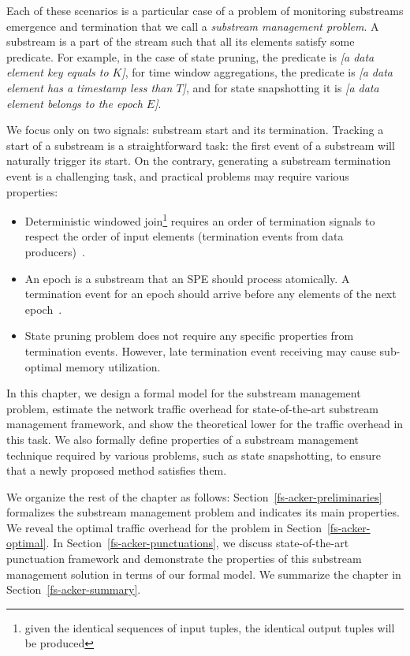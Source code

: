 Each of these scenarios is a particular case of a problem of monitoring substreams emergence and termination that we call a {\em substream management problem}. A substream is a part of the stream such that all its elements satisfy some predicate. 
For example, in the case of state pruning, the predicate is {\em [a data element key equals to $K$]}, for time window aggregations, the predicate is {\em [a data element has a timestamp less than $T$]}, and for state snapshotting it is {\em [a data element belongs to the epoch $E$]}.

We focus only on two signals: substream start and its termination. Tracking a start of a substream is a straightforward task: the first event of a substream will naturally trigger its start. On the contrary, generating a substream termination event is a challenging task, and practical problems may require various properties:
\begin{itemize}
    \item Deterministic windowed join\footnote{given the identical sequences of input tuples, the identical output tuples will be produced} requires an order of termination signals to respect the order of input elements (termination events from data producers)~\cite{najdataei2019stretch, gulisano2016scalejoin}.
    \item An epoch is a substream that an SPE should process atomically. A termination event for an epoch should arrive before any elements of the next epoch~\cite{2015arXiv150608603C}.
    \item State pruning problem does not require any specific properties from termination events. However, late termination event receiving may cause sub-optimal memory utilization.
\end{itemize}

In this chapter, we design a formal model for the substream management problem, estimate the network traffic overhead for state-of-the-art substream management framework, and show the theoretical lower for the traffic overhead in this task. We also formally define properties of a substream management technique required by various problems, such as state snapshotting, to ensure that a newly proposed method satisfies them. 

We organize the rest of the chapter as follows: 
Section~\ref{fs-acker-preliminaries} formalizes the substream management problem and indicates its main properties. We reveal the optimal traffic overhead for the problem in Section~\ref{fs-acker-optimal}. In Section~\ref{fs-acker-punctuations}, we discuss state-of-the-art punctuation framework and demonstrate the properties of this substream management solution in terms of our formal model. We summarize the chapter in Section~\ref{fs-acker-summary}.